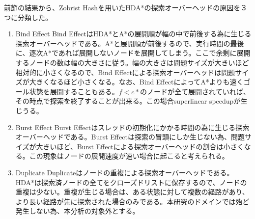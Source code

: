 \documentclass{jsarticle}
\begin{document}
前節の結果から、Zobrist Hashを用いたHDA*の探索オーバーヘッドの原因を３つに分類した。

\begin{enumerate}
\item Bind Effect
\newline
Bind EffectはHDA*とA*の展開順が幅の中で前後する為に生じる探索オーバーヘッドである。A*と展開順が前後するので、実行時間の最後に、逐次A*であれば展開しないノードを展開してしまう。ここで余剰に展開するノードの数は幅の大きさに従う。幅の大きさは問題サイズが大きいほど相対的に小さくなるので、Bind Effectによる探索オーバーヘッドは問題サイズが大きくなるほど小さくなる。なお、Bind EffectによってA*よりも速くゴール状態を展開することもある。$f < c*$のノードが全て展開されていれば、その時点で探索を終了することが出来る。この場合superlinear speedupが生じうる。
\newline

\item Burst Effect
\newline
Burst Effectはスレッドの初期化にかかる時間の為に生じる探索オーバーヘッドである。Burst Effectは探索の冒頭にしか生じない為、問題サイズが大きいほど、Burst Effectによる探索オーバーヘッドの割合は小さくなる。この現象はノードの展開速度が速い場合に起こると考えられる。
\newline

\item Duplicate
\newline
Duplicateはノードの重複による探索オーバーヘッドである。HDA*は探索済ノードの全てをクローズドリストに保存するので、ノードの重複は少ない。重複が生じる場合は、ある状態に対して複数の経路があり、より長い経路が先に探索された場合のみである。本研究のドメインでは殆ど発生しない為、本分析の対象外とする。

\end{enumerate}
\end{document}
